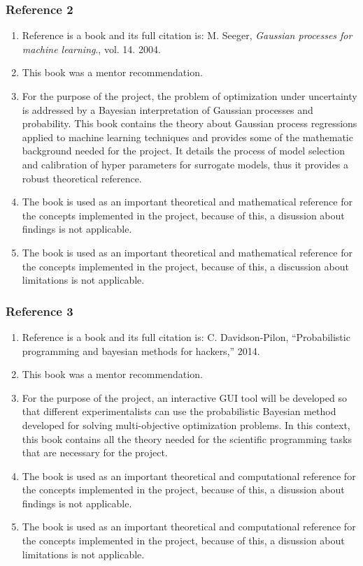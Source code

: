 \documentclass{journal}
\begin{document}
\subsubsection{Reference 2}
\begin{enumerate}
	\item Reference  \cite{Seeger2004} is a book and its full citation is: M. Seeger, \textit{Gaussian processes for machine learning}., vol. 14. 2004.
	\item This book was a mentor recommendation.
	\item For the purpose of the project, the problem of optimization under uncertainty is addressed by a Bayesian interpretation of Gaussian processes and probability. This book contains the theory about Gaussian process regressions applied to machine learning techniques and provides some of the mathematic background needed for the project. It details the process of model selection and calibration of hyper parameters for surrogate models, thus it provides a robust theoretical reference.
	\item The book is used as an important theoretical and mathematical reference for the concepts implemented in the project, because of this, a disussion about findings is not applicable.
	\item The book is used as an important theoretical and mathematical reference for the concepts implemented in the project, because of this, a discussion about limitations is not applicable.
\end{enumerate}

\subsubsection{Reference 3}
\begin{enumerate}
	\item Reference \cite{Davidson-Pilon2014} is a book and its full citation is: C. Davidson-Pilon, “Probabilistic programming and bayesian methods for hackers,” 2014.
	\item This book was a mentor recommendation.
	\item For the purpose of the project, an interactive GUI tool will be developed so that different experimentalists can use the probabilistic Bayesian method developed for solving multi-objective optimization problems. In this context, this book contains all the theory needed for the scientific programming tasks that are necessary for the project. 
	\item The book is used as an important theoretical and computational reference for the concepts implemented in the project, because of this, a disussion about findings is not applicable.
	\item The book is used as an important theoretical and computational reference for the concepts implemented in the project, because of this, a disussion about limitations is not applicable.
\end{enumerate}
\end{document}
